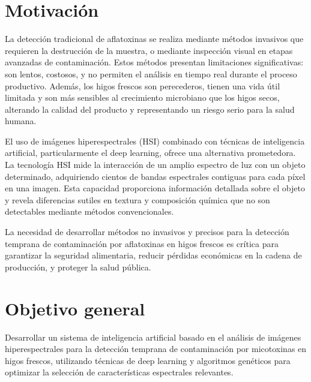 \section{Motivación}
La detección tradicional de aflatoxinas se realiza mediante métodos invasivos que requieren la destrucción de la muestra, o mediante inspección visual en etapas avanzadas de contaminación. Estos métodos presentan limitaciones significativas: son lentos, costosos, y no permiten el análisis en tiempo real durante el proceso productivo. Además, los higos frescos son perecederos, tienen una vida útil limitada y son más sensibles al crecimiento microbiano que los higos secos, alterando la calidad del producto y representando un riesgo serio para la salud humana.

\vspace{5mm}

El uso de imágenes hiperespectrales (HSI) combinado con técnicas de inteligencia artificial, particularmente el deep learning, ofrece una alternativa prometedora. La tecnología HSI mide la interacción de un amplio espectro de luz con un objeto determinado, adquiriendo cientos de bandas espectrales contiguas para cada píxel en una imagen. Esta capacidad proporciona información detallada sobre el objeto y revela diferencias sutiles en textura y composición química que no son detectables mediante métodos convencionales.

\vspace{5mm}

La necesidad de desarrollar métodos no invasivos y precisos para la detección temprana de contaminación por aflatoxinas en higos frescos es crítica para garantizar la seguridad alimentaria, reducir pérdidas económicas en la cadena de producción, y proteger la salud pública.

\section{Objetivo general}
Desarrollar un sistema de inteligencia artificial basado en el análisis de imágenes hiperespectrales para la detección temprana de contaminación por micotoxinas en higos frescos, utilizando técnicas de deep learning y algoritmos genéticos para optimizar la selección de características espectrales relevantes.


